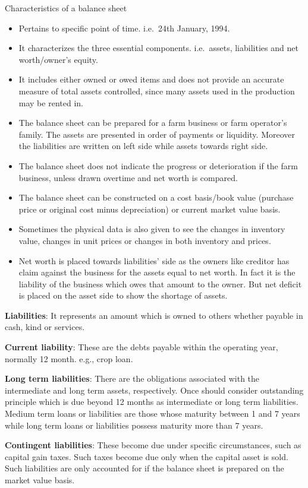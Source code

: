\documentclass[12pt,ignorenonframetext,aspectratio=169]{beamer}
\providecommand{\tightlist}{%
  \setlength{\itemsep}{0pt}\setlength{\parskip}{0pt}}
\begin{document}
\begin{frame}{Characteristics of a balance sheet}
\protect\hypertarget{characteristics-of-a-balance-sheet}{}
\footnotesize

\begin{itemize}
\tightlist
\item
  Pertains to specific point of time. i.e.~24th January, 1994.
\item
  It characterizes the three essential components. i.e.~assets,
  liabilities and net worth/owner's equity.
\item
  It includes either owned or owed items and does not provide an
  accurate measure of total assets controlled, since many assets used in
  the production may be rented in.
\item
  The balance sheet can be prepared for a farm business or farm
  operator's family. The assets are presented in order of payments or
  liquidity. Moreover the liabilities are written on left side while
  assets towards right side.
\item
  The balance sheet does not indicate the progress or deterioration if
  the farm business, unless drawn overtime and net worth is compared.
\item
  The balance sheet can be constructed on a cost basis/book value
  (purchase price or original cost minus depreciation) or current market
  value basis.
\item
  Sometimes the physical data is also given to see the changes in
  inventory value, changes in unit prices or changes in both inventory
  and prices.
\item
  Net worth is placed towards liabilities' side as the owners like
  creditor has claim against the business for the assets equal to net
  worth. In fact it is the liability of the business which owes that
  amount to the owner. But net deficit is placed on the asset side to
  show the shortage of assets.
\end{itemize}
\end{frame}

\begin{frame}{}
\protect\hypertarget{section}{}
\textbf{Liabilities}: It represents an amount which is owned to others
whether payable in cash, kind or services.

\textbf{Current liability}: These are the debts payable within the
operating year, normally 12 month. e.g., crop loan.

\textbf{Long term liabilities}: There are the obligations associated
with the intermediate and long term assets, respectively. Once should
consider outstanding principle which is due beyond 12 months as
intermediate or long term liabilities. Medium term loans or liabilities
are those whose maturity between 1 and 7 years while long term loans or
liabilities possess maturity more than 7 years.

\textbf{Contingent liabilities}: These become due under specific
circumstances, such as capital gain taxes. Such taxes become due only
when the capital asset is sold. Such liabilities are only accounted for
if the balance sheet is prepared on the market value basis.
\end{frame}
\end{document}
